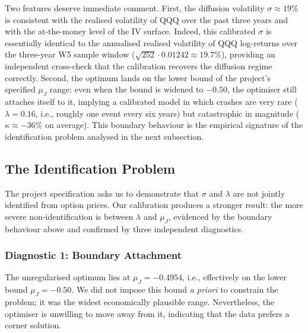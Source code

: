 Two features deserve immediate comment. First, the diffusion volatility
$\sigma \approx 19\%$ is consistent with the realised volatility of QQQ
over the past three years and with the at-the-money level of the IV
surface. Indeed, this calibrated $\sigma$ is essentially identical to
the annualised realised volatility of QQQ log-returns over the
three-year W5 sample window ($\sqrt{252}\cdot 0.01242 \approx 19.7\%$),
providing an independent cross-check that the calibration recovers the
diffusion regime correctly. Second, the optimum lands on the lower bound of the project's
specified $\mu_J$ range: even when the bound is widened to $-0.50$, the
optimiser still attaches itself to it, implying a calibrated model in
which crashes are very rare ($\lambda = 0.16$, i.e., roughly one event
every six years) but catastrophic in magnitude ($\kappa \approx -36\%$
on average). This boundary behaviour is the empirical signature of the
identification problem analysed in the next subsection.




\subsection*{The Identification Problem}

The project specification asks us to demonstrate that $\sigma$ and
$\lambda$ are not jointly identified from option prices. Our calibration
produces a stronger result: the more severe non-identification is
between $\lambda$ and $\mu_J$, evidenced by the boundary behaviour above
and confirmed by three independent diagnostics.

\subsubsection*{Diagnostic 1: Boundary Attachment}

The unregularised optimum lies at $\mu_J = -0.4954$, i.e., effectively
on the lower bound $\mu_J = -0.50$. We did not impose this bound
\emph{a priori} to constrain the problem; it was the widest economically
plausible range. Nevertheless, the optimiser is unwilling to move away
from it, indicating that the data prefers a corner solution.

